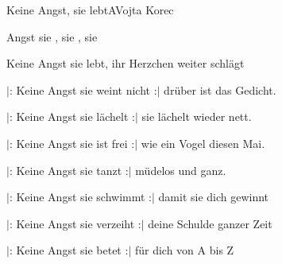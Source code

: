 \begin{song}{Keine Angst, sie lebt}{A}{Vojta Korec}

\begin{SBVerse}

 Angst sie , sie , sie 

Keine Angst sie lebt, ihr Herzchen weiter schlägt

\end{SBVerse}

\begin{SBVerse}

$|$: Keine Angst sie weint nicht :$|$ drüber ist das Gedicht.

\end{SBVerse}

\begin{SBVerse}

$|$: Keine Angst sie lächelt :$|$ sie lächelt wieder nett.

\end{SBVerse}

\begin{SBVerse}

$|$: Keine Angst sie ist frei :$|$ wie ein Vogel diesen Mai.

\end{SBVerse}

\begin{SBVerse}

$|$: Keine Angst sie tanzt :$|$ müdelos und ganz.

\end{SBVerse}

\begin{SBVerse}

$|$: Keine Angst sie schwimmt :$|$ damit sie dich gewinnt

\end{SBVerse}

\begin{SBVerse}

$|$: Keine Angst sie verzeiht :$|$ deine Schulde ganzer Zeit

\end{SBVerse}

\begin{SBVerse}

$|$: Keine Angst sie betet :$|$ für dich von A bis Z

\end{SBVerse}

\end{song}

